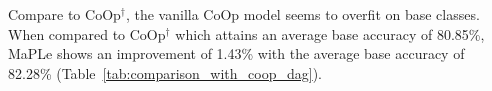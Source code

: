\documentclass[10pt,twocolumn,letterpaper]{article}
\begin{document}
\begin{table}[!h]
\vspace{-0.1in}
    \centering
    \caption{ Generalization comparison of MaPLe with CoOp\dag.}
    \label{tab:comparison_with_coop_dag}
    \vspace{-0.15in}
\end{table}

Compare to CoOp$^{\dag}$, the vanilla CoOp model seems to overfit on base classes. When compared to CoOp$^{\dag}$ which attains an average base accuracy of 80.85\%, MaPLe shows an improvement of 1.43\% with the average base accuracy of 82.28\% (Table~\ref{tab:comparison_with_coop_dag}).
 
\end{document}
